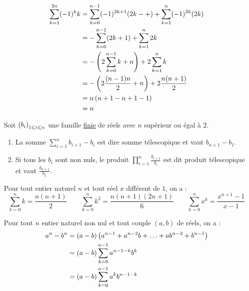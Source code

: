 \begin{corr}
	\begin{align*}
		\sum_{k=1}^{2n} (-1)^k k & = \sum_{k=0}^{n-1} (-1)^{2k+1} (2k-+) + \sum_{k=1}^{n} (-1)^{2k} (2k) \\
		                         & = -\sum_{k=0}^{n-1} (2k+1) + \sum_{k=1}^{n} 2k                        \\
		                         & = -\left(2\sum_{k=0}^{n-1} k + n\right) + 2\sum_{k=1}^{n} k                \\
		                         & = -\left(2\frac{(n-1)n}{2} + n\right) + 2\frac{n(n+1)}{2}                  \\
		                         & = n\left(n+1-n+1-1\right)                                                  \\
		                         & = n                                                                   \\
	\end{align*}
\end{corr}
\begin{defprop}[téléscopage]
	Soit \(\left(b_i\right)_{1 \leqslant i \leqslant n}\) une famille \underline{finie} de réels avec \(n\) supérieur ou égal à \(2\).
	\begin{enumerate}
		\item La somme \(\sum_{i=1}^n b_{i+1}-b_i\) est dire somme télescopique et vaut \(b_{n+1}-b_1\).
		\item Si tous les \(b_i\) sont non nuls, le produit \(\prod_{i=1}^n \frac{b_{i+1}}{b_i}\) est dit produit télescopique et vaut \(\frac{b_{n+1}}{b_1}\).
	\end{enumerate}
\end{defprop}

\begin{defprop}
	Pour tout entier naturel \(n\) et tout réel \(x\) différent de \(1\), on a :
	\[\sum_{k=0}^n k = \frac{n(n+1)}{2} \qquad \sum_{k=0}^n k^2 = \frac{n(n+1)(2n+1)}{6} \qquad \sum_{k=0}^n x^k = \frac{x^{n+1}-1}{x-1}\]
\end{defprop}

\begin{defprop}[Factorisation de \(a^n-b^n\) ]
	Pour tout \(n\) entier naturel non nul et tout couple \((a,b)\) de réels, on a :
	\begin{align*}
		a^n-b^n & = (a-b)\left(a^{n-1} + a^{n-2}b + \ldots + ab^{n-2} + b^{n-1}\right) \\
		        & = (a-b)\sum_{k=0}^{n-1} a^{n-1-k}b^k                            \\
		        & = (a-b)\sum_{k=0}^{n-1} a^kb^{n-1-k}                            \\
	\end{align*}
\end{defprop}

